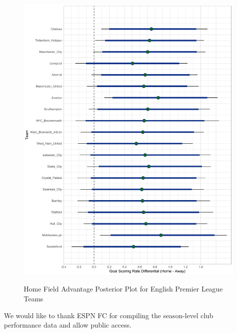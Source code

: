 \documentclass[USenglish]{article}
\begin{document}
\begin{figure}
\caption{Home Field Advantage Posterior Plot for English Premier League Teams}
{\includegraphics[width=0.90\linewidth]{HFA_EPL11.pdf}}
\label{fig7}
\end{figure}


\begin{acknowledgement}

We would like to thank ESPN FC for compiling the season-level club performance data and allow public access.

\end{acknowledgement}

\newpage

%

\end{document}
